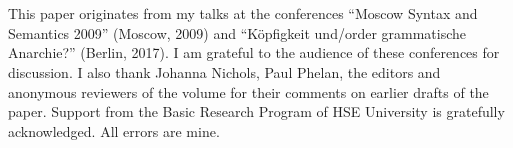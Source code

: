 \documentclass[output=paper
  ,nobabel
  ,draftmode
  ,colorlinks, citecolor=brown
]{langscibook}
\begin{document}
\section*{\acknowledgmentsUS}

This paper originates from my talks at the conferences ``Moscow Syntax and Semantics 2009'' (Moscow, 2009) and ``Köpfigkeit und/order grammatische Anarchie?'' (Berlin, 2017). I am grateful to the audience of these conferences for discussion. I also thank Johanna Nichols, Paul Phelan, the editors and anonymous reviewers of the volume for their comments on earlier drafts of the paper. Support from the Basic Research Program of HSE University is gratefully acknowledged. All errors are mine.

{\sloppy
\printbibliography[heading=subbibliography,notkeyword=this]
}
\end{document}
